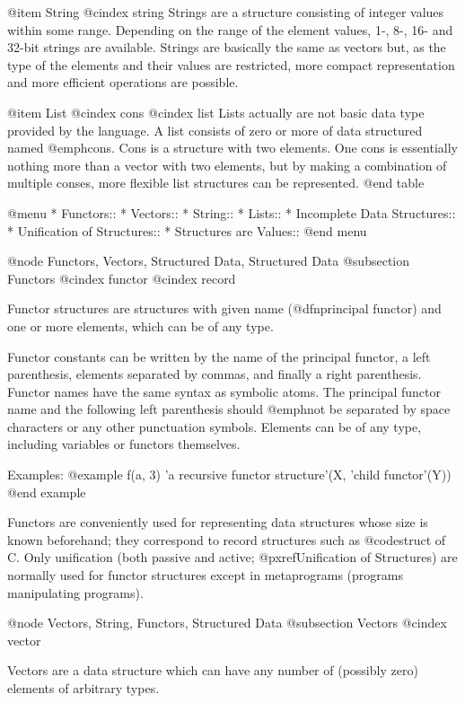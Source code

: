 {@item String
@cindex string
Strings are a structure consisting of integer values within some range.
Depending on the range of the element values, 1-, 8-, 16- and 32-bit
strings are available.  Strings are basically the same as vectors but,
as the type of the elements and their values are restricted, more
compact representation and more efficient operations are possible.

@item List
@cindex cons
@cindex list
Lists actually are not basic data type provided by the language.  A list
consists of zero or more of data structured named @emph{cons}.  Cons is
a structure with two elements.  One cons is essentially nothing more
than a vector with two elements, but by making a combination of multiple
conses, more flexible list structures can be represented.
@end table

@menu
* Functors::                    
* Vectors::                     
* String::                      
* Lists::                       
* Incomplete Data Structures::  
* Unification of Structures::   
* Structures are Values::       
@end menu

@node Functors, Vectors, Structured Data, Structured Data
@subsection Functors
@cindex functor
@cindex record

Functor structures are structures with given name (@dfn{principal
functor}) and one or more elements, which can be of any type.

Functor constants can be written by the name of the principal functor, a
left parenthesis, elements separated by commas, and finally a right
parenthesis.  Functor names have the same syntax as symbolic atoms.  The
principal functor name and the following left parenthesis should
@emph{not} be separated by space characters or any other punctuation
symbols.  Elements can be of any type, including variables or functors
themselves.

Examples:
@example
f(a, 3)   'a recursive functor structure'(X, 'child functor'(Y))
@end example

Functors are conveniently used for representing data structures whose
size is known beforehand; they correspond to record structures such as
@code{struct} of C.  Only unification (both passive and active;
@pxref{Unification of Structures}) are normally used for functor
structures except in metaprograms (programs manipulating programs).

@node Vectors, String, Functors, Structured Data
@subsection Vectors
@cindex vector

Vectors are a data structure which can have any number of (possibly
zero) elements of arbitrary types.

}
